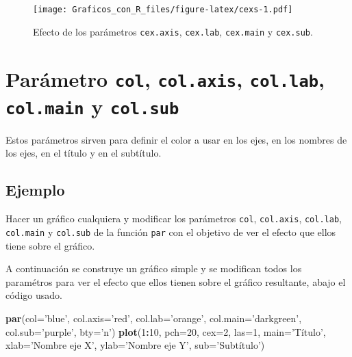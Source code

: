 \documentclass[10pt,]{krantz}
\makeatletter
\newenvironment{Shaded}{\begin{snugshade}}{\end{snugshade}}
\newcommand{\KeywordTok}[1]{\textcolor[rgb]{0.13,0.29,0.53}{\textbf{#1}}}
\newcommand{\DataTypeTok}[1]{\textcolor[rgb]{0.13,0.29,0.53}{#1}}
\newcommand{\DecValTok}[1]{\textcolor[rgb]{0.00,0.00,0.81}{#1}}
\newcommand{\StringTok}[1]{\textcolor[rgb]{0.31,0.60,0.02}{#1}}
\newcommand{\OperatorTok}[1]{\textcolor[rgb]{0.81,0.36,0.00}{\textbf{#1}}}
\newcommand{\NormalTok}[1]{#1}
\newenvironment{kframe}{%
\medskip{}
\setlength{\fboxsep}{.8em}
 \def\at@end@of@kframe{}%
 \ifinner\ifhmode%
  \def\at@end@of@kframe{\end{minipage}}%
  \begin{minipage}{\columnwidth}%
 \fi\fi%
 \def\FrameCommand##1{\hskip\@totalleftmargin \hskip-\fboxsep
 \colorbox{shadecolor}{##1}\hskip-\fboxsep
     \hskip-\linewidth \hskip-\@totalleftmargin \hskip\columnwidth}%
 \MakeFramed {\advance\hsize-\width
   \@totalleftmargin\z@ \linewidth\hsize
   \@setminipage}}%
 {\par\unskip\endMakeFramed%
 \at@end@of@kframe}
\renewenvironment{Shaded}{\begin{kframe}}{\end{kframe}}
\makeatother
\begin{document}
\begin{figure}
\centering
\texttt{[image: Graficos\_con\_R\_files/figure-latex/cexs-1.pdf]}
\caption{\label{fig:cexs}Efecto de los parámetros \texttt{cex.axis},
\texttt{cex.lab}, \texttt{cex.main} y \texttt{cex.sub}.}
\end{figure}

\section{\texorpdfstring{Parámetro \texttt{col}, \texttt{col.axis},
\texttt{col.lab}, \texttt{col.main} y \texttt{col.sub} 
}{Parámetro col, col.axis, col.lab, col.main y col.sub  }}\label{parametro-col-col.axis-col.lab-col.main-y-col.sub}

Estos parámetros sirven para definir el color a usar en los ejes, en los
nombres de los ejes, en el título y en el subtítulo.

\subsection*{Ejemplo}\label{ejemplo-40}


Hacer un gráfico cualquiera y modificar los parámetros \texttt{col},
\texttt{col.axis}, \texttt{col.lab}, \texttt{col.main} y
\texttt{col.sub} de la función \texttt{par} con el objetivo de ver el
efecto que ellos tiene sobre el gráfico.

A continuación se construye un gráfico simple y se modifican todos los
paramétros para ver el efecto que ellos tienen sobre el gráfico
resultante, abajo el código usado.

\begin{Shaded}
\begin{Highlighting}[]
\KeywordTok{par}\NormalTok{(}\DataTypeTok{col=}\StringTok{'blue'}\NormalTok{, }\DataTypeTok{col.axis=}\StringTok{'red'}\NormalTok{, }\DataTypeTok{col.lab=}\StringTok{'orange'}\NormalTok{,}
    \DataTypeTok{col.main=}\StringTok{'darkgreen'}\NormalTok{, }\DataTypeTok{col.sub=}\StringTok{'purple'}\NormalTok{, }\DataTypeTok{bty=}\StringTok{'n'}\NormalTok{)}
\KeywordTok{plot}\NormalTok{(}\DecValTok{1}\OperatorTok{:}\DecValTok{10}\NormalTok{, }\DataTypeTok{pch=}\DecValTok{20}\NormalTok{, }\DataTypeTok{cex=}\DecValTok{2}\NormalTok{, }\DataTypeTok{las=}\DecValTok{1}\NormalTok{,}
     \DataTypeTok{main=}\StringTok{'Título'}\NormalTok{, }\DataTypeTok{xlab=}\StringTok{'Nombre eje X'}\NormalTok{,}
     \DataTypeTok{ylab=}\StringTok{'Nombre eje Y'}\NormalTok{, }\DataTypeTok{sub=}\StringTok{'Subtítulo'}\NormalTok{)}
\end{Highlighting}
\end{Shaded}
\end{document}
